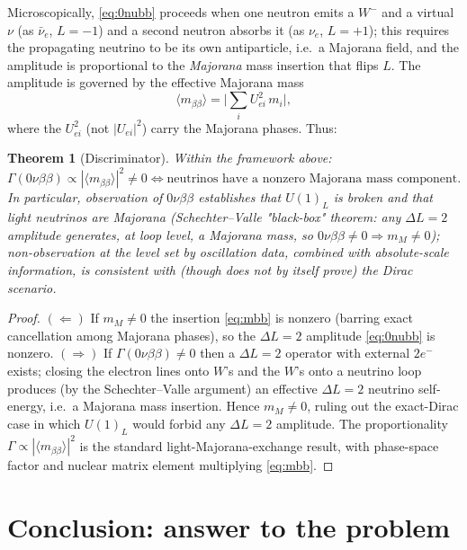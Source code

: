 \documentclass[12pt]{article}
\newtheorem{theorem}{Theorem}
\theoremstyle{definition}
\begin{document}
Microscopically, \eqref{eq:0nubb} proceeds when one neutron emits a
$W^-$ and a virtual $\nu$ (as $\bar\nu_e$, $L=-1$) and a second neutron
absorbs it (as $\nu_e$, $L=+1$); this requires the propagating neutrino to
be its own antiparticle, i.e.\ a Majorana field, and the amplitude is
proportional to the \emph{Majorana} mass insertion that flips $L$. The
amplitude is governed by the effective Majorana mass
\begin{equation}\label{eq:mbb}
\langle m_{\beta\beta}\rangle
=\Big|\sum_i U_{ei}^2\,m_i\Big|,
\end{equation}
where the $U_{ei}^2$ (not $|U_{ei}|^2$) carry the Majorana phases. Thus:
\begin{theorem}[Discriminator]\label{thm:disc}
Within the framework above:
\[
\Gamma(0\nu\beta\beta)\propto |\langle m_{\beta\beta}\rangle|^2\neq0
\iff \text{neutrinos have a nonzero Majorana mass component.}
\]
In particular, observation of $0\nu\beta\beta$ establishes that
$U(1)_L$ is broken and that light neutrinos are Majorana
(Schechter–Valle "black-box" theorem: any $\Delta L=2$ amplitude
generates, at loop level, a Majorana mass, so $0\nu\beta\beta\neq0
\Rightarrow m_M\neq0$); non-observation at the level set by
oscillation data, combined with absolute-scale information, is consistent
with (though does not by itself prove) the Dirac scenario.
\end{theorem}
\begin{proof}
$(\Leftarrow)$ If $m_M\neq0$ the insertion \eqref{eq:mbb} is nonzero
(barring exact cancellation among Majorana phases), so the $\Delta L=2$
amplitude \eqref{eq:0nubb} is nonzero. $(\Rightarrow)$ If
$\Gamma(0\nu\beta\beta)\neq0$ then a $\Delta L=2$ operator with external
$2e^-$ exists; closing the electron lines onto $W$'s and the $W$'s onto a
neutrino loop produces (by the Schechter–Valle argument) an effective
$\Delta L=2$ neutrino self-energy, i.e.\ a Majorana mass insertion. Hence
$m_M\neq0$, ruling out the exact-Dirac case in which $U(1)_L$ would forbid
any $\Delta L=2$ amplitude. The proportionality
$\Gamma\propto|\langle m_{\beta\beta}\rangle|^2$ is the standard
light-Majorana-exchange result, with phase-space factor and nuclear
matrix element multiplying \eqref{eq:mbb}.
\end{proof}

\section{Conclusion: answer to the problem}
\end{document}
